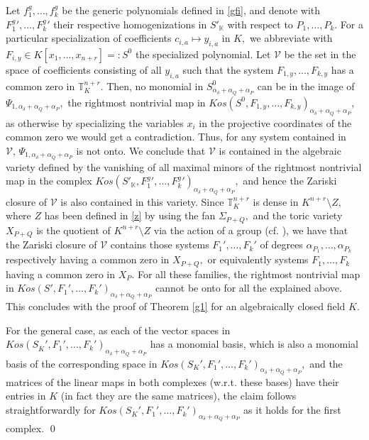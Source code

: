 \documentclass[a4paper,11pt]{amsart}
\newcommand{\K}{\mathbb{K}}
\newcommand{\T}{\mathbb{T}}
\newcommand{\cV}{{\mathcal V}}
\numberwithin{thm}{section}
\numberwithin{equation}{section}
\theoremstyle{definition}
\theoremstyle{plain}
\begin{document}
 Let $f_1^g,\ldots, f_k^g$ be the generic polynomials defined in \eqref{gfi}, and denote with $F_1^g{'},\ldots, F_ k^g{'}$ their respective homogenizations in $S'_\K$ with respect to $P_1,\ldots, P_k.$ For a particular specialization of coefficients
$c_{i,a}\mapsto y_{i,a}$ in $K,$ we abbreviate with $F_{i,y}\in K[x_1,\ldots, x_{n+r}]=:S^0$ the specialized polynomial. Let $\cV$ be the set in the space of coefficients consisting of all $y_{i,a}$ such that the system $F_{1,y},\ldots, F_{k,y}$ has a common zero in $\T_{K}^{n+r}$. Then, no monomial in $S^0_{\alpha_\delta+\alpha_Q+\alpha_P}$  can be in the image of $\Psi_{1,\alpha_\delta+\alpha_Q+\alpha_P},$ the rightmost nontrivial map in
 $Kos(S^0,F_{1,y},\ldots, F_{k,y})_{\alpha_\delta+\alpha_Q+\alpha_P},$   as otherwise by specializing the variables $x_i$ in the projective coordinates of the common zero we would get a contradiction. Thus, for any system contained in $\cV,\, \Psi_{1,\alpha_\delta+\alpha_Q+\alpha_P}$ is not onto. We conclude that $\cV$ is contained in the algebraic variety defined by the vanishing of all maximal minors of the rightmost nontrivial map in the complex
 $Kos(S'_\K,F_1^g{'}, \ldots, F_k^g{'})_{\alpha_\delta+\alpha_Q+\alpha_P},$ and hence the Zariski closure of $\cV$ is also contained in this variety. Since  $\T_{K}^{n+r}$ is dense in $K^{n+r}\setminus Z,$ where $Z$ has been defined in \eqref{z} by using the fan $\Sigma_{P+Q},$  and the toric variety $X_{P+Q}$ is the quotient of $K^{n+r}\setminus Z$ via the action of a group (cf. \cite[\S 5.1]{CLS11}), we have that the Zariski closure of $\cV$ contains those systems $F_1',\ldots, F_k'$ of degrees $\alpha_{P_1},\ldots, \alpha_{P_k}$ respectively having a common zero in $X_{P+Q},$ or equivalently systems $F_1,\ldots, F_k$ having a common zero in $X_P.$  For all these families, the rightmost nontrivial map in $Kos(S',F_1',\ldots, F_k')_{\alpha_\delta+\alpha_Q+\alpha_P}$ cannot be onto for all the explained above. This concludes with the proof of Theorem \ref{g1} for an algebraically closed field $K$.


 For the general case, as each of the vector spaces in $Kos(S_{\overline{K}}',F_1',\ldots, F_k')_{\alpha_\delta+\alpha_Q+\alpha_P}$  has a monomial basis, which is also a monomial basis of the corresponding space in $Kos(S_K',F_1',\ldots, F_k')_{\alpha_\delta+\alpha_Q+\alpha_P},$ and the matrices of the linear maps in both complexes (w.r.t. these bases) have their entries in $K$ (in fact they are the same matrices), the claim follows straightforwardly for $Kos(S_K',F_1',\ldots, F_k')_{\alpha_\delta+\alpha_Q+\alpha_P}$ as it holds for the first complex.
   \qed
\end{document}
